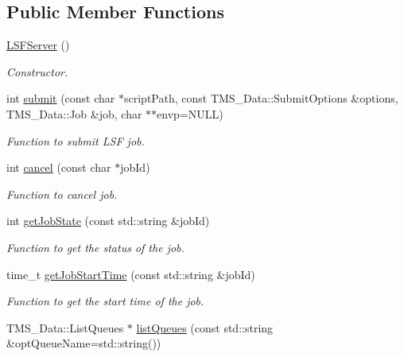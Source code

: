 \subsection*{Public Member Functions}
\begin{DoxyCompactItemize}
\item 
\hypertarget{classLSFServer_a8dffbaec82d90ed07015822f4e04f0f5}{
\hyperlink{classLSFServer_a8dffbaec82d90ed07015822f4e04f0f5}{LSFServer} ()}
\label{classLSFServer_a8dffbaec82d90ed07015822f4e04f0f5}

\begin{DoxyCompactList}\small\item\em Constructor. \item\end{DoxyCompactList}\item 
int \hyperlink{classLSFServer_a2e8c4df4101e12dded11fa20faa994f1}{submit} (const char $\ast$scriptPath, const TMS\_\-Data::SubmitOptions \&options, TMS\_\-Data::Job \&job, char $\ast$$\ast$envp=NULL)
\begin{DoxyCompactList}\small\item\em Function to submit LSF job. \item\end{DoxyCompactList}\item 
int \hyperlink{classLSFServer_a878231ec54cb12d7ffaf58586c6c8e13}{cancel} (const char $\ast$jobId)
\begin{DoxyCompactList}\small\item\em Function to cancel job. \item\end{DoxyCompactList}\item 
int \hyperlink{classLSFServer_ad6ad00defcea4be1f680b05c75fe7b2e}{getJobState} (const std::string \&jobId)
\begin{DoxyCompactList}\small\item\em Function to get the status of the job. \item\end{DoxyCompactList}\item 
time\_\-t \hyperlink{classLSFServer_ad8ae2df6193db77a2aaa56b2322150e6}{getJobStartTime} (const std::string \&jobId)
\begin{DoxyCompactList}\small\item\em Function to get the start time of the job. \item\end{DoxyCompactList}\item 
TMS\_\-Data::ListQueues $\ast$ \hyperlink{classLSFServer_a8dc6b7ad5db30b51fafdd3f40466324c}{listQueues} (const std::string \&optQueueName=std::string())
$$
\end{DoxyCompactItemize}
